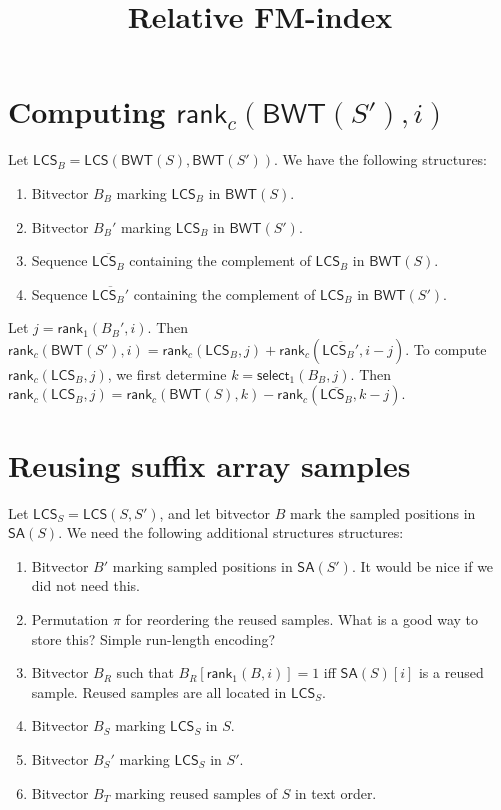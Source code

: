 \documentclass[11pt,a4paper]{article}
\newcommand{\BWT}
  {\ensuremath{\mathsf{BWT}}}
\newcommand{\SA}
  {\ensuremath{\mathsf{SA}}}
\newcommand{\LCS}
  {\ensuremath{\mathsf{LCS}}}
\newcommand{\mrank}{\ensuremath{\mathsf{rank}}}
\newcommand{\mselect}{\ensuremath{\mathsf{select}}}
\begin{document}
\title{Relative FM-index}
\author{}
\maketitle

\section*{Computing $\mrank_{c}(\BWT(S'), i)$}

Let $\LCS_{B} = \LCS(\BWT(S), \BWT(S'))$. We have the following structures:
\begin{enumerate}
\item Bitvector $B_{B}$ marking $\LCS_{B}$ in $\BWT(S)$.
\item Bitvector $B_{B}'$ marking $\LCS_{B}$ in $\BWT(S')$.
\item Sequence $\overline{\LCS_{B}}$ containing the complement of $\LCS_{B}$ in $\BWT(S)$.
\item Sequence $\overline{\LCS_{B}'}$ containing the complement of $\LCS_{B}$ in $\BWT(S')$.
\end{enumerate}

Let $j = \mrank_{1}(B_{B}', i)$. Then $\mrank_{c}(\BWT(S'), i) = \mrank_{c}(\LCS_{B}, j) + \mrank_{c}(\overline{\LCS_{B}'}, i-j).$ To compute $\mrank_{c}(\LCS_{B}, j)$, we first determine $k = \mselect_{1}(B_{B}, j)$. Then $\mrank_{c}(\LCS_{B}, j) = \mrank_{c}(\BWT(S), k) - \mrank_{c}(\overline{\LCS_{B}}, k-j)$.


\section*{Reusing suffix array samples}

Let $\LCS_{S} = \LCS(S, S')$, and let bitvector $B$ mark the sampled positions in $\SA(S)$. We need the following additional structures structures:
\begin{enumerate}
\item Bitvector $B'$ marking sampled positions in $\SA(S')$. It would be nice if we did not need this.
\item Permutation $\pi$ for reordering the reused samples. What is a good way to store this? Simple run-length encoding?
\item Bitvector $B_{R}$ such that $B_{R}[\mrank_{1}(B, i)] = 1$ iff $\SA(S)[i]$ is a reused sample. Reused samples are all located in $\LCS_{S}$.
\item Bitvector $B_{S}$ marking $\LCS_{S}$ in $S$.
\item Bitvector $B_{S}'$ marking $\LCS_{S}$ in $S'$.
\item Bitvector $B_{T}$ marking reused samples of $S$ in text order.
\end{enumerate}
\end{document}

